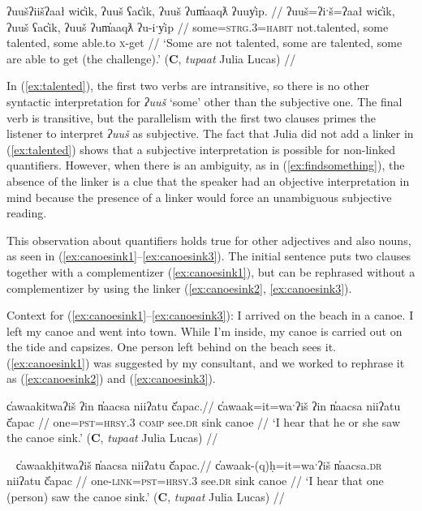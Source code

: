 \ex \label{ex:talented}
\begingl
\glpreamble ʔuušʔiišʔaał wic̓ik, ʔuuš ʕac̓ik, ʔuuš ʔum̓aaqƛ ʔuuy̓ip. //
\gla ʔuuš=ʔiˑš=ʔaał wic̓ik, ʔuuš ʕac̓ik, ʔuuš ʔum̓aaqƛ ʔu-iˑy̓ip //
\glb some=\textsc{strg.3}=\textsc{habit} not.talented, some talented, some able.to \textsc{x}-get //
\glft ‘Some are not talented, some are talented, some are able to get (the challenge).’ (\textbf{C}, \textit{tupaat} Julia Lucas) //
\endgl
\xe

In (\ref{ex:talented}), the first two verbs are intransitive, so there is no other syntactic interpretation for \textit{ʔuuš} `some' other than the subjective one. The final verb is transitive, but the parallelism with the first two clauses primes the listener to interpret \textit{ʔuuš} as subjective. The fact that Julia did not add a linker in (\ref{ex:talented}) shows that a subjective interpretation is possible for non-linked quantifiers. However, when there is an ambiguity, as in (\ref{ex:findsomething}), the absence of the linker is a clue that the speaker had an objective interpretation in mind because the presence of a linker would force an unambiguous subjective reading.

This observation about quantifiers holds true for other adjectives and also nouns, as seen in (\ref{ex:canoesink1}--\ref{ex:canoesink3}). The initial sentence puts two clauses together with a complementizer (\ref{ex:canoesink1}), but can be rephrased without a complementizer by using the linker (\ref{ex:canoesink2}, \ref{ex:canoesink3}).

\vspace{5pt}

\noindent Context for (\ref{ex:canoesink1}--\ref{ex:canoesink3}): I arrived on the beach in a canoe. I left my canoe and went into town. While I'm inside, my canoe is carried out on the tide and capsizes. One person left behind on the beach sees it. (\ref{ex:canoesink1}) was suggested by my consultant, and we worked to rephrase it as (\ref{ex:canoesink2}) and (\ref{ex:canoesink3}).

\ex \label{ex:canoesink1}
\begingl
\glpreamble c̓awaakitwaʔiš ʔin n̓aacsa niiʔatu č̓apac.//
\gla c̓awaak=it=waˑʔiš ʔin n̓aacsa niiʔatu č̓apac //
\glb one=\textsc{pst}=\textsc{hrsy.3} \textsc{comp} see.\textsc{dr} sink canoe //
\glft `I hear that he or she saw the canoe sink.' (\textbf{C}, \textit{tupaat} Julia Lucas) //
\endgl
\xe

\ex~ \label{ex:canoesink2}
\begingl
\glpreamble c̓awaakḥitwaʔiš n̓aacsa niiʔatu č̓apac.//
\gla c̓awaak-(q)ḥ=it=waˑʔiš n̓aacsa.\textsc{dr} niiʔatu č̓apac //
\glb one-\textsc{link}=\textsc{pst}=\textsc{hrsy.3} see.\textsc{dr} sink canoe //
\glft `I hear that one (person) saw the canoe sink.' (\textbf{C}, \textit{tupaat} Julia Lucas) //
\endgl
\xe

